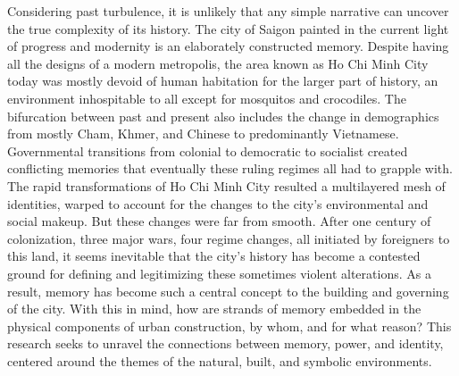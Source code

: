Considering past turbulence, it is unlikely that any simple narrative can uncover the true complexity of its history. The city of Saigon painted in the current light of progress and modernity is an elaborately constructed memory.  Despite having all the designs of a modern metropolis, the area known as Ho Chi Minh City today was mostly devoid of human habitation for the larger part of history, an environment inhospitable to all except for mosquitos and crocodiles. The bifurcation between past and present also includes the change in demographics from mostly Cham, Khmer, and Chinese to predominantly Vietnamese. Governmental transitions from colonial to democratic to socialist created conflicting memories that eventually these ruling regimes all had to grapple with. The rapid transformations of Ho Chi Minh City resulted a multilayered mesh of identities, warped to account for the changes to the city's environmental and social makeup. But these changes were far from smooth. After one century of colonization, three major wars, four regime changes, all initiated by foreigners to this land, it seems inevitable that the city’s history has become a contested ground for defining and legitimizing these sometimes violent alterations. As a result, memory has become such a central concept to the building and governing of the city. With this in mind, how are strands of memory embedded in the physical components of urban construction, by whom, and for what reason? This research seeks to unravel the connections between memory, power, and identity, centered around the themes of the natural, built, and symbolic environments.

